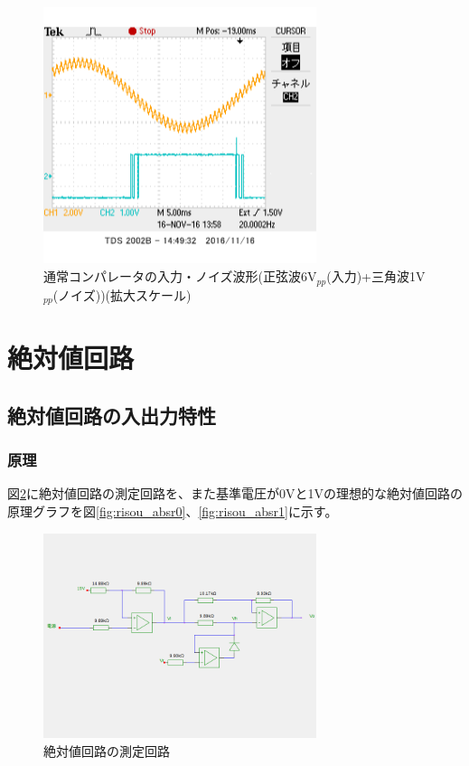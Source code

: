 \documentclass[11pt,a4j]{jsarticle}
\begin{document}
 \begin{figure}[htbp]
  \centering
  \includegraphics[width=8cm,clip]{1_2_noise_after_6-1_SmallScale.png}
  \caption{通常コンパレータの入力・ノイズ波形(正弦波6V$_{pp}$(入力)+三角波1V$_{pp}$(ノイズ))(拡大スケール)}
  \label{fig:noise_after_6-1_small}
 \end{figure}
    
    
    
    
    \clearpage
    
 \section{絶対値回路}
  \subsection{絶対値回路の入出力特性}
   \subsubsection{原理}
    
    図\ref{fig:abs_tokusei}に絶対値回路の測定回路を、また基準電圧が0Vと1Vの理想的な絶対値回路の原理グラフを図\ref{fig:risou_absr0}、\ref{fig:risou_absr1}に示す。
    
    \begin{figure}[htbp]
  \centering
  \includegraphics[width=8cm,clip]{abs_tokusei.png}
  \caption{絶対値回路の測定回路}
  \label{fig:abs_tokusei}
 \end{figure}%
    
\end{document}
